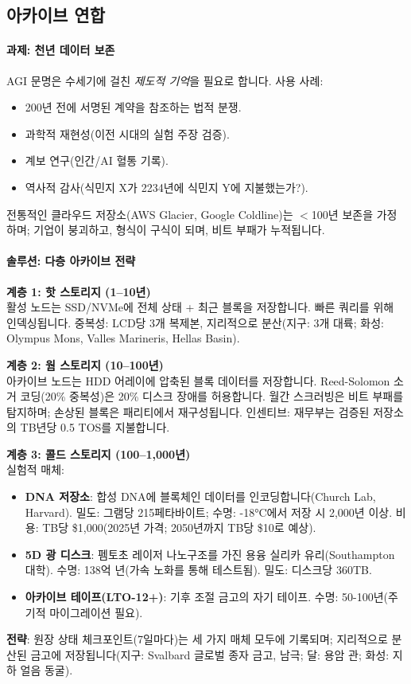 \documentclass[11pt]{article}
\begin{document}
\subsection{아카이브 연합}

\paragraph{과제: 천년 데이터 보존}
AGI 문명은 수세기에 걸친 \emph{제도적 기억}을 필요로 합니다. 사용 사례:
\begin{itemize}[noitemsep]
  \item 200년 전에 서명된 계약을 참조하는 법적 분쟁.
  \item 과학적 재현성(이전 시대의 실험 주장 검증).
  \item 계보 연구(인간/AI 혈통 기록).
  \item 역사적 감사(식민지 X가 2234년에 식민지 Y에 지불했는가?).
\end{itemize}
전통적인 클라우드 저장소(AWS Glacier, Google Coldline)는 $<$100년 보존을 가정하며; 기업이 붕괴하고, 형식이 구식이 되며, 비트 부패가 누적됩니다.

\paragraph{솔루션: 다층 아카이브 전략}

\textbf{계층 1: 핫 스토리지 (1--10년)}\\
활성 노드는 SSD/NVMe에 전체 상태 + 최근 블록을 저장합니다. 빠른 쿼리를 위해 인덱싱됩니다. 중복성: LCD당 3개 복제본, 지리적으로 분산(지구: 3개 대륙; 화성: Olympus Mons, Valles Marineris, Hellas Basin).

\textbf{계층 2: 웜 스토리지 (10--100년)}\\
아카이브 노드는 HDD 어레이에 압축된 블록 데이터를 저장합니다. Reed-Solomon 소거 코딩(20\% 중복성)은 20\% 디스크 장애를 허용합니다. 월간 스크러빙은 비트 부패를 탐지하며; 손상된 블록은 패리티에서 재구성됩니다. 인센티브: 재무부는 검증된 저장소의 TB년당 0.5 TOS를 지불합니다.

\textbf{계층 3: 콜드 스토리지 (100--1,000년)}\\
실험적 매체:
\begin{itemize}[noitemsep]
  \item \textbf{DNA 저장소}: 합성 DNA에 블록체인 데이터를 인코딩합니다(Church Lab, Harvard). 밀도: 그램당 215페타바이트; 수명: -18°C에서 저장 시 2,000년 이상. 비용: TB당 \$1,000(2025년 가격; 2050년까지 TB당 \$10로 예상).
  \item \textbf{5D 광 디스크}: 펨토초 레이저 나노구조를 가진 용융 실리카 유리(Southampton 대학). 수명: 138억 년(가속 노화를 통해 테스트됨). 밀도: 디스크당 360TB.
  \item \textbf{아카이브 테이프(LTO-12+)}: 기후 조절 금고의 자기 테이프. 수명: 50-100년(주기적 마이그레이션 필요).
\end{itemize}
\textbf{전략}: 원장 상태 체크포인트(7일마다)는 세 가지 매체 모두에 기록되며; 지리적으로 분산된 금고에 저장됩니다(지구: Svalbard 글로벌 종자 금고, 남극; 달: 용암 관; 화성: 지하 얼음 동굴).
\end{document}
